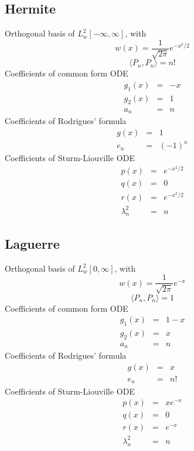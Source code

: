 \documentclass[oneside,a4paper,11pt]{article}
\begin{document}
\subsection{Hermite}
Orthogonal basis of $L^2_w[-\infty,\infty]$, with
\[w(x) = \frac{1}{\sqrt{2\pi}}e^{-x^2/2}\] 
\[\langle P_n,P_n\rangle = n!\]
Coefficients of common form ODE
\begin{eqnarray*}
g_1(x) &=& -x\\
g_2(x) &=& 1\\
a_n &=& n
\end{eqnarray*}
Coefficients of Rodrigues' formula
 \begin{eqnarray*}
g(x) &=& 1 \\
e_n &=& (-1)^n
\end{eqnarray*}
Coefficients of Sturm-Liouville ODE
\begin{eqnarray*}
p(x) &=& e^{-x^2/2}\\
q(x) &=& 0\\
r(x) &=& e^{-x^2/2}\\
\lambda^2_n &=& n
\end{eqnarray*}

\subsection{Laguerre}
Orthogonal basis of $L^2_w[0,\infty]$, with
\[w(x) = \frac{1}{\sqrt{2\pi}}e^{-x}\] 
\[\langle P_n,P_n\rangle = 1\]
Coefficients of common form ODE
\begin{eqnarray*}
g_1(x) &=& 1 - x\\
g_2(x) &=& x\\
a_n &=& n
\end{eqnarray*}
Coefficients of Rodrigues' formula
 \begin{eqnarray*}
g(x) &=& x \\
e_n &=& n!
\end{eqnarray*}
Coefficients of Sturm-Liouville ODE
\begin{eqnarray*}
p(x) &=& xe^{-x}\\
q(x) &=& 0\\
r(x) &=& e^{-x}\\
\lambda^2_n &=& n
\end{eqnarray*}
\end{document}
